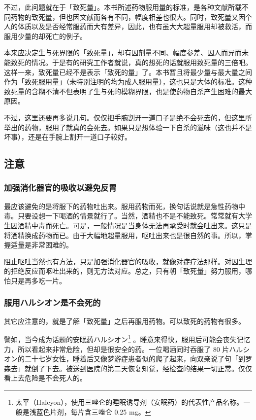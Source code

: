 \documentclass[UTF8]{ctexart}
\begin{document}
不过，此问题就在于「致死量」。本书所述药物服用量的标准，是各种文献所载不同药物的致死量，但也因文献而各有不同，幅度相差也很大。同时，致死量又因个人的体质以及是否经常服药而大有差异，因此，也有虽大大超量服用却被救活，而服用少量的却死亡的例子。

本来应决定生与死界限的「致死量」，却有因剂量不同、幅度参差、因人而异而未能致死的情况。于是有的研究工作者就说，真的想死的话就服用致死量的三倍吧。这样一来，致死量已经不是表示「致死的量」了。本书暂且将最少量与最大量之间作为「致死服用量」（未特别注明的均为成人服用量），这也只是大体的标准。这种致死量的含糊不清不但表明了生与死的模糊界限，也是使药物自杀产生困难的最大原因。

不过，这里还要再多说几句。仅仅把手腕割开一道口子是绝不会死去的，但这里所举出的药物，服用了就真的会死去。如果只是想体验一下自杀的滋味（这也并不是坏事），还是在手腕上割开一道口子较好。

\subsection{注意}

\subsubsection*{加强消化器官的吸收以避免反胃}

最应该避免的是将服下的药物吐出来。服用药物而死，换句话说就是急性药物中毒。只要设想一下喝酒的情景就行了。当然，酒精也不是不能致死。常常就有大学生因酒精中毒而死亡。可是，一般情况是当身体无法再承受时就会吐出来。这只是将酒精换成药物而已。由于大幅地超量服用，呕吐出来也是很自然的事。所以，掌握适量是非常困难的。

阻止呕吐当然也有方法，只是加强消化器官的吸收，就像对症疗法那样。对因生理的拒绝反应而呕吐出来的，则无方法对应。总之，只有朝「致死量」努力服用，哪怕只是再多吃一片。

\subsubsection*{服用ハルシオン是不会死的}

其它应注意的，就是了解「致死量」之后再服用药物。可以致死的药物有很多。

譬如，当今成为话题的安眠药ハルシオン\footnote{太平（Halcyon），使用三唑仑的睡眠诱导剂（安眠药）的代表性产品名称。一般是浅蓝色片剂，每片含三唑仑 0.25 mg。} 。睡意来得快，服用后可能会丧失记忆力，所以看起来非常危险，但却是很安全的药。一位喝酒同时吞服了 $80$ 片ハルシオン的二十七岁女性，睡着后又像梦游症患者似的爬了起来，向双亲说了句「到罗森去」就倒了下去。被送到医院的第二天恢复知觉，经检查的结果一切正常。仅仅看上去危险是不会死人的。
\end{document}
